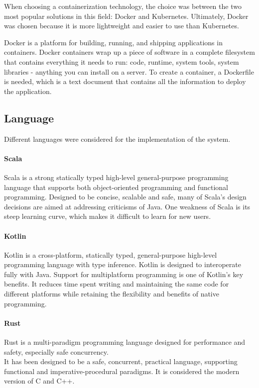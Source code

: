 \documentclass[12pt,a4paper,openright,twoside]{book}
\begin{document}
When choosing a containerization technology, the choice was between the two most popular solutions in this field: Docker and Kubernetes.
Ultimately, Docker was chosen because it is more lightweight and easier to use than Kubernetes.

Docker is a platform for building, running, and shipping applications in containers.
Docker containers wrap up a piece of software in a complete filesystem that contains everything it needs to run:
code, runtime, system tools, system libraries - anything you can install on a server.
To create a container, a Dockerfile is needed, which is a text document that contains all the information to deploy the application.

\subsection{Language}
Different languages were considered for the implementation of the system.

\paragraph*{Scala}
Scala is a strong statically typed high-level general-purpose programming language that supports both object-oriented 
programming and functional programming. 
Designed to be concise, scalable and safe, many of Scala's design decisions are aimed at addressing criticisms of Java.
One weakness of Scala is its steep learning curve, which makes it difficult to learn for new users.

\paragraph*{Kotlin}
Kotlin is a cross-platform, statically typed, general-purpose high-level programming language with type inference. 
Kotlin is designed to interoperate fully with Java.
Support for multiplatform programming is one of Kotlin’s key benefits. It reduces time spent writing and maintaining 
the same code for different platforms while retaining the flexibility and benefits of native programming.

\paragraph*{Rust}

Rust is a multi-paradigm programming language designed for performance and safety, especially safe concurrency. \\
It has been designed to be a safe, concurrent, practical language, supporting functional and imperative-procedural paradigms.
It is considered the modern version of C and C++.
\end{document}
